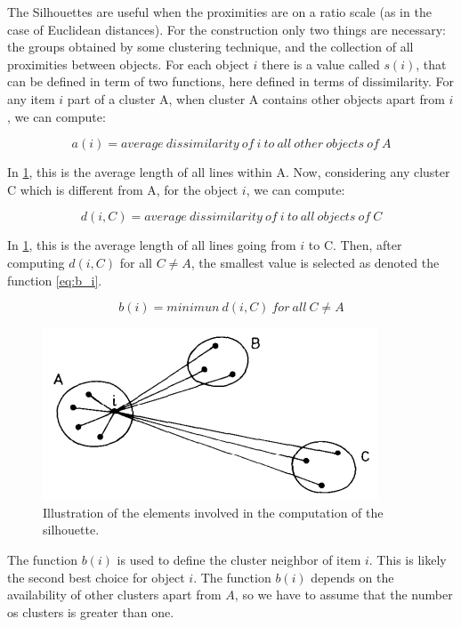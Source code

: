 \documentclass[journal]{IEEEtran}
\begin{document}
	The Silhouettes are useful when the proximities are on a ratio scale (as in the case of Euclidean distances). For the construction only two things are necessary: the groups obtained by some clustering technique, and the collection of all proximities between objects. For each object $i$ there is a value called $s(i)$, that can be defined in term of two functions, here defined in terms of dissimilarity. For any item $i$ part of a cluster A, when cluster A contains other objects apart from $i$, we can compute:
	
	\begin{equation} \label{eq:a_i}
	a(i) = average~dissimilarity~of~i~to~all~other~objects~of~A
	\end{equation}
	
	In \ref{fig:silhouette}, this is the average length of all lines within A. Now, considering any cluster C which is different from A, for the object $i$, we can compute:
	
	\begin{equation} \label{eq:d_i}
	d(i, C) = average~dissimilarity~of~i~to~all~objects~of~C
	\end{equation}
	
	In \ref{fig:silhouette}, this is the average length of all lines going from $i$ to C. Then, after computing $d(i, C)$ for all $C \neq A$, the smallest value is selected as denoted the function \ref{eq:b_i}.
	
	\begin{equation} \label{eq:b_i}
	b(i) = minimun~d(i, C)~for~all~C \neq A
	\end{equation}
	
	\begin{figure}[!htb]
		\centering
		\includegraphics[scale=.6]{figures/silhouette_img.png}
		\caption{Illustration of the elements involved in the computation of the silhouette. \cite{rousseeuw1987silhouettes}}
		\label{fig:silhouette}
	\end{figure}
	
	The function $b(i)$ is used to define the cluster neighbor of item $i$. This is likely the second best choice for object $i$. The function $b(i)$ depends on the availability of other clusters apart from $A$, so we have to assume that the number os clusters is greater than one.
	
\end{document}
